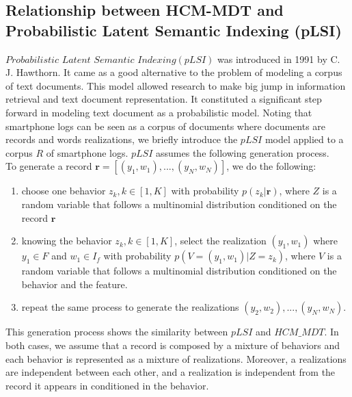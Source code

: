 \subsection{Relationship between HCM-MDT and Probabilistic Latent Semantic Indexing (pLSI)}

$Probabilistic$ $Latent$ $Semantic$ $Indexing(pLSI)$ was introduced in 1991 by C. J. Hawthorn\cite{plsi}. It came as a good alternative to the problem of modeling a corpus of text documents. This model allowed research to make big jump in information retrieval and text document representation. It constituted a significant step forward in modeling text document as a probabilistic model. Noting that smartphone logs can be seen as a corpus of documents where documents are records and words realizations, we briefly introduce the $pLSI$ model applied to a corpus $R$ of smartphone logs. $pLSI$ assumes the following generation process.
\\To generate a record $\mathbf{r}=[(y_{1},w_{1}),...,(y_{N},w_{N})]$, we do the following:
\begin{enumerate} 
	\item choose one behavior $z_{k},k\in [1,K]$ with probability $p(z_{k}|\mathbf{r})$, where $Z$ is a random variable that follows a multinomial distribution conditioned on the record $\mathbf{r}$
	\item knowing the behavior $z_{k},k\in [1,K]$, select the realization $(y_{1},w_{1})$ where $y_{1}\in F$ and $w_{1}\in I_{f}$ with probability $p(V=(y_{1},w_{1})|Z=z_{k})$, where $V$ is a random variable that follows a 				multinomial distribution conditioned on the behavior and the feature.
	\item repeat the same process to generate the realizations $(y_{2},w_{2}),...,(y_{N},w_{N})$. 
\end{enumerate} 
This generation process shows the similarity between $pLSI$ and $HCM\_MDT$. In both cases, we assume that a record is composed by a mixture of behaviors and each behavior is represented as a mixture of realizations. Moreover, a realizations are independent between each other, and a realization is independent from the record it appears in conditioned in the behavior.\par

